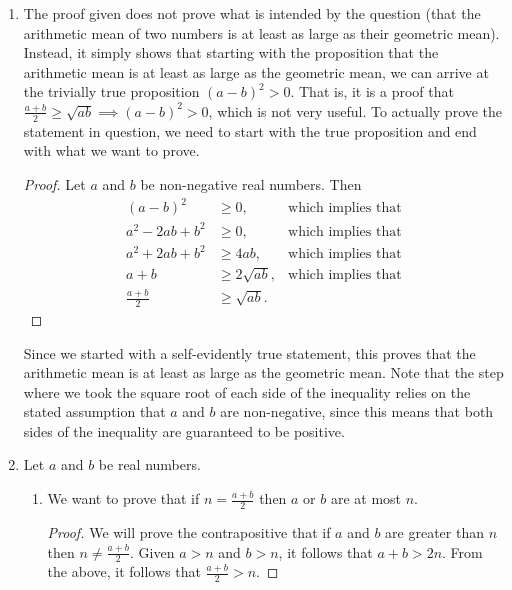 \documentclass{article}
\begin{document}
\maketitle

\begin{enumerate}
\item
  The proof given does not prove what is intended by the question (that the arithmetic mean of two numbers is at least as large as their geometric mean).
  Instead, it simply shows that starting with the proposition that the arithmetic mean is at least as large as the geometric mean, we can arrive at the trivially true proposition $(a - b)^2 > 0$.
  That is, it is a proof that $\frac{a + b}{2} \ge \sqrt{ab} \implies (a - b)^2 > 0$, which is not very useful.
  To actually prove the statement in question, we need to start with the true proposition and end with what we want to prove.
  \begin{proof}
    Let $a$ and $b$ be non-negative real numbers.
    Then
    \begin{align*}
      (a - b)^2 &\ge 0, &\mbox{which implies that}\\
      a^2 - 2ab + b^2 &\ge 0, &\mbox{which implies that}\\
      a^2 + 2ab + b^2 &\ge 4ab, &\mbox{which implies that}\\
      a + b &\ge 2\sqrt{ab}, &\mbox{which implies that}\\
      \frac{a + b}{2} &\ge \sqrt{ab}.
    \end{align*}
  \end{proof}
  Since we started with a self-evidently true statement, this proves that the arithmetic mean is at least as large as the geometric mean.
  Note that the step where we took the square root of each side of the inequality relies on the stated assumption that $a$ and $b$ are non-negative, since this means that both sides of the inequality are guaranteed to be positive.
\item
  Let $a$ and $b$ be real numbers.
  \begin{enumerate}
  \item
    We want to prove that if $n = \frac{a + b}{2}$ then $a$ or $b$ are at most $n$.
    \begin{proof}
      We will prove the contrapositive that if $a$ and $b$ are greater than $n$ then $n \ne \frac{a + b}{2}$.
      Given $a > n$ and $b > n$, it follows that $a + b > 2n$.
      From the above, it follows that $\frac{a + b}{2} > n$.

\end{proof}
\end{enumerate}
\end{enumerate}
\end{document}
